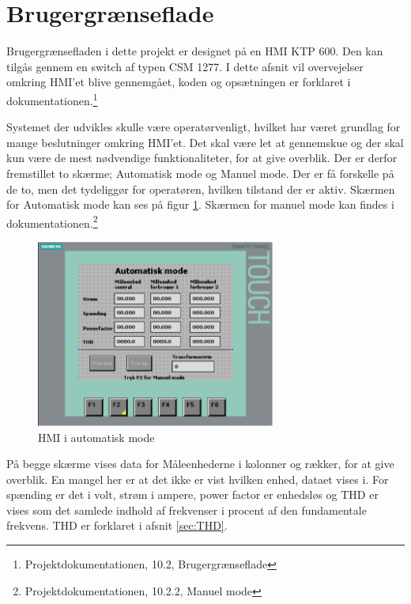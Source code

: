 

\section{Brugergrænseflade}

Brugergrænsefladen i dette projekt er designet på en HMI KTP 600. Den kan tilgås gennem en switch af typen CSM 1277. I dette afsnit vil overvejelser omkring HMI'et blive gennemgået, koden og opsætningen er forklaret i dokumentationen.\footnote{Projektdokumentationen, 10.2, Brugergrænseflade}


Systemet der udvikles skulle være operatørvenligt, hvilket har været grundlag for mange beslutninger omkring HMI'et. Det skal være let at gennemskue og der skal kun være de mest nødvendige funktionaliteter, for at give overblik.
Der er derfor fremstillet to skærme; Automatisk mode og Manuel mode. Der er få forskelle på de to, men det tydeliggør for operatøren, hvilken tilstand der er aktiv. Skærmen for Automatisk mode kan ses på figur \ref{fig:HMIAutomatiskModeDesign}. Skærmen for manuel mode kan findes i dokumentationen.\footnote{Projektdokumentationen, 10.2.2, Manuel mode}

\begin{figure}[H] %
	\centering
	\includegraphics[width=0.7\textwidth]{Figure/HMIAutomatiskModeDesign}
	\caption{HMI i automatisk mode}
	\label{fig:HMIAutomatiskModeDesign}
\end{figure}

På begge skærme vises data for Måleenhederne i kolonner og rækker, for at give overblik. En mangel her er at det ikke er vist hvilken enhed, dataet vises i. For spænding er det i volt, strøm i ampere, power factor er enhedsløs og THD er vises som det samlede indhold af frekvenser i procent af den fundamentale frekvens. THD er forklaret i afsnit \ref{sec:THD}.


